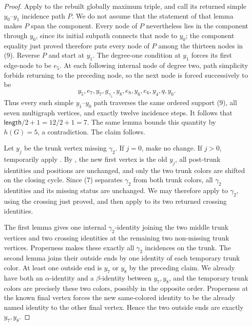 \begin{proof}
Apply  to the rebuilt globally
maximum triple, and call its returned simple $y_0$--$y_1$ incidence path
$P$.  We do not assume that the statement of that lemma makes $P$ span the
component.  Every node of $P$ nevertheless lies in the component through
$y_0$, since its initial subpath connects that node to $y_0$; the component
equality just proved therefore puts every node of $P$ among the thirteen
nodes in (9).  Reverse $P$ and start at $y_1$.  The degree-one condition at
$y_1$ forces its first edge-node to be $e_5$.  At each following internal
node of degree two, path simplicity forbids returning to the preceding
node, so the next node is forced successively to be
\[
 y_5,e_7,y_7,g_{\gamma_1},y_8,e_8,y_6,e_6,y_4,q,y_0.
\]
Thus every such simple $y_1$--$y_0$ path traverses the same ordered
support (9), all seven multigraph vertices, and exactly twelve incidence
steps.  It follows that $\mathsf{length}/2+1=12/2+1=7$.  The same lemma
bounds this quantity by $h(G)=5$, a contradiction.  The claim follows.

Let $y_j$ be the trunk vertex missing $\gamma_2$.  If $j=0$, make no
change.  If $j>0$, temporarily apply
.  By
, the new first vertex is the old $y_j$, all
post-trunk identities and positions are unchanged, and only the two
trunk colors are shifted on the closing cycle.  Since (7) separates
$\gamma_2$ from both trunk colors, all $\gamma_2$ identities and its
missing status are unchanged.  We may therefore apply
 to $\gamma_2$, using the crossing
just proved, and then apply
 to its two returned crossing
identities.

The first lemma gives one internal $\gamma_2$-identity joining the two
middle trunk vertices and two crossing identities at the remaining two
non-missing trunk vertices.  Properness makes these exactly all
$\gamma_2$ incidences on the trunk.  The second lemma joins their outside
ends by one identity of each temporary trunk color.  At least one outside
end is $y_7$ or $y_8$ by the preceding claim.  We already have both an
$\alpha$-identity and a $\beta$-identity between $y_7,y_8$, and the
temporary trunk colors are precisely these two colors, possibly in the
opposite order.  Properness at the known final vertex forces the new
same-colored identity to be the already named identity to the other final
vertex.  Hence the two outside ends are exactly $y_7,y_8$.


\end{proof}
